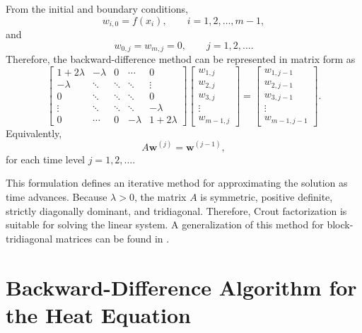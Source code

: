 \documentclass[a4paper]{article}
\begin{document}
From the initial and boundary conditions,
\begin{equation}
w_{i,0}=f(x_i),\qquad i=1,2,\ldots,m-1,
\end{equation}
and
\begin{equation}
w_{0,j}=w_{m,j}=0,\qquad j=1,2,\ldots.
\end{equation}
Therefore, the backward-difference method can be represented in matrix form as
\begin{equation}\label{eq::linear_system}
\begin{bmatrix}
1+2\lambda & -\lambda & 0 & \cdots & 0 \\
-\lambda & \ddots & \ddots & \ddots & \vdots \\
0 & \ddots & \ddots & \ddots & 0 \\
\vdots & \ddots & \ddots & \ddots & -\lambda \\
0 & \cdots & 0 & -\lambda & 1+2\lambda
\end{bmatrix}
\begin{bmatrix}
w_{1,j} \\
w_{2,j} \\
w_{3,j} \\
\vdots \\
w_{m-1,j}
\end{bmatrix}
=
\begin{bmatrix}
w_{1,j-1} \\
w_{2,j-1} \\
w_{3,j-1} \\
\vdots \\
w_{m-1,j-1}
\end{bmatrix}.
\end{equation}
Equivalently,
\begin{equation}
A\mathbf{w}^{(j)}=\mathbf{w}^{(j-1)},
\end{equation}
for each time level $j=1,2,\ldots$.

This formulation defines an iterative method for approximating the solution as time advances. Because $\lambda>0$, the matrix $A$ is symmetric, positive definite, strictly diagonally dominant, and tridiagonal. Therefore, Crout factorization is suitable for solving the linear system. A generalization of this method for block-tridiagonal matrices can be found in \cite{Medina}.

\section{Backward-Difference Algorithm for the Heat Equation}
\end{document}

